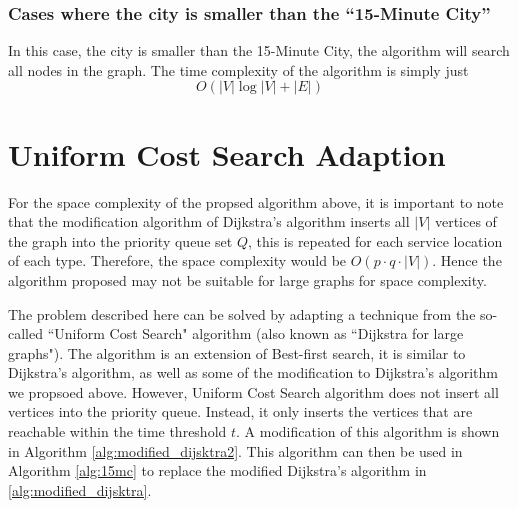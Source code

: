 \subsubsection{Cases where the city is smaller than the ``15-Minute City''}

In this case, the city is smaller than the 15-Minute City, the algorithm will search all nodes in the graph. The time complexity of the algorithm is simply just $$O(|V|\log |V|+|E|)$$

\section{Uniform Cost Search Adaption}

For the space complexity of the propsed algorithm above, it is important to note that the modification algorithm of Dijkstra's algorithm inserts all $|V|$ vertices of the graph into the priority queue set $Q$, this is repeated for each service location of each type. Therefore, the space complexity would be $O(p\cdot q\cdot |V|)$. Hence the algorithm proposed may not be suitable for large graphs for space complexity.

The problem described here can be solved by adapting a technique from the so-called ``Uniform Cost Search" algorithm (also known as ``Dijkstra for large graphs"). The algorithm is an extension of Best-first search, it is similar to Dijkstra's algorithm, as well as some of the modification to Dijkstra's algorithm we propsoed above. However, Uniform Cost Search algorithm does not insert all vertices into the priority queue. Instead, it only inserts the vertices that are reachable within the time threshold $t$. A modification of this algorithm is shown in Algorithm \ref{alg:modified_dijsktra2}. This algorithm can then be used in Algorithm \ref{alg:15mc} to replace the modified Dijkstra's algorithm in \ref{alg:modified_dijsktra}.

